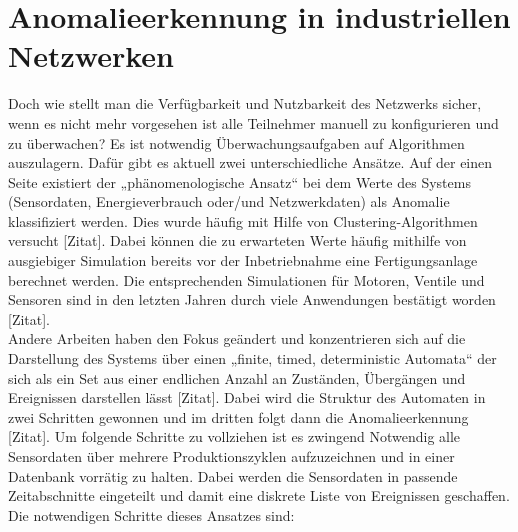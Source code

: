 \section{Anomalieerkennung in industriellen Netzwerken}
Doch wie stellt man die Verfügbarkeit und Nutzbarkeit des Netzwerks sicher, wenn es nicht mehr vorgesehen ist alle Teilnehmer manuell zu konfigurieren und zu überwachen? Es ist notwendig Überwachungsaufgaben auf Algorithmen auszulagern. Dafür gibt es aktuell zwei unterschiedliche Ansätze. Auf der einen Seite existiert der „phänomenologische Ansatz“ bei dem Werte des Systems (Sensordaten, Energieverbrauch oder/und Netzwerkdaten) als Anomalie klassifiziert werden. Dies wurde häufig mit Hilfe von Clustering-Algorithmen versucht [Zitat]. Dabei können die zu erwarteten Werte häufig mithilfe von ausgiebiger Simulation bereits vor der Inbetriebnahme eine Fertigungsanlage berechnet werden. Die entsprechenden Simulationen für Motoren, Ventile und Sensoren sind in den letzten Jahren durch viele Anwendungen bestätigt worden [Zitat].\\
Andere Arbeiten haben den Fokus geändert und konzentrieren sich auf die Darstellung des Systems über einen „finite, timed, deterministic Automata“ der sich als ein Set aus einer endlichen Anzahl an Zuständen, Übergängen und Ereignissen darstellen lässt [Zitat]. Dabei wird die Struktur des Automaten in zwei Schritten gewonnen und im dritten folgt dann die Anomalieerkennung [Zitat]. Um folgende Schritte zu vollziehen ist es zwingend Notwendig alle Sensordaten über mehrere Produktionszyklen aufzuzeichnen und in einer Datenbank vorrätig zu halten. Dabei werden die Sensordaten in passende Zeitabschnitte eingeteilt und damit eine diskrete Liste von Ereignissen geschaffen. Die notwendigen Schritte dieses Ansatzes sind:
